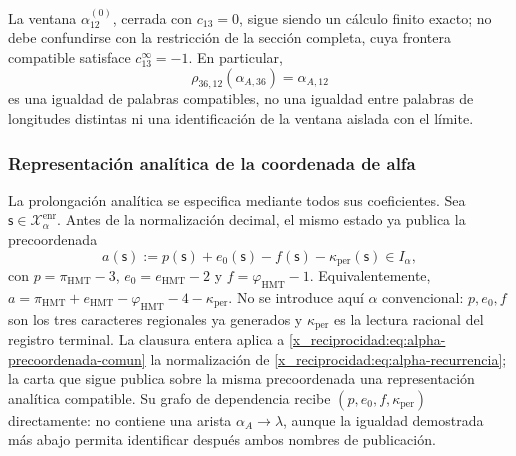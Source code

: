 La ventana \(\alpha_{12}^{(0)}\), cerrada con \(c_{13}=0\), sigue siendo un
cálculo finito exacto; no debe confundirse con la restricción de la sección
completa, cuya frontera compatible satisface \(c_{13}^{\infty}=-1\). En
particular,
\begin{equation}
 \rho_{36,12}(\alpha_{A,36})=\alpha_{A,12}
 \label{x_reciprocidad:eq:alpha-rho-36-12-proyectiva}
\end{equation}
es una igualdad de palabras compatibles, no una igualdad entre palabras de
longitudes distintas ni una identificación de la ventana aislada con el
límite.



\subsubsection{Representación analítica de la coordenada de alfa}
\label{x_reciprocidad:subsec:alpha-lector-completo-rev08}

La prolongación analítica se especifica mediante todos sus coeficientes.
Sea \(\mathsf s\in\mathcal X_\alpha^{\mathrm{enr}}\). Antes
de la normalización decimal, el mismo estado ya publica la precoordenada
\begin{equation}
 a(\mathsf s):=p(\mathsf s)+e_0(\mathsf s)-f(\mathsf s)
                 -\kappa_{\mathrm{per}}(\mathsf s)\in I_\alpha,
 \label{x_reciprocidad:eq:alpha-precoordenada-comun}
\end{equation}
con \(p=\pi_{\mathrm{HMT}}-3\),
\(e_0=e_{\mathrm{HMT}}-2\) y
\(f=\varphi_{\mathrm{HMT}}-1\). Equivalentemente,
\(a=\pi_{\mathrm{HMT}}+e_{\mathrm{HMT}}-
\varphi_{\mathrm{HMT}}-4-\kappa_{\mathrm{per}}\). No se introduce aquí
\(\alpha\) convencional: \(p,e_0,f\) son los tres caracteres regionales ya
generados y \(\kappa_{\mathrm{per}}\) es la lectura racional del registro
terminal. La clausura entera aplica a
\eqref{x_reciprocidad:eq:alpha-precoordenada-comun} la normalización de
\eqref{x_reciprocidad:eq:alpha-recurrencia}; la carta que sigue publica sobre la misma
precoordenada una representación analítica compatible. Su grafo de
dependencia recibe \((p,e_0,f,\kappa_{\mathrm{per}})\) directamente: no
contiene una arista \(\alpha_A\to\lambda\), aunque la igualdad demostrada más
abajo permita identificar después ambos nombres de publicación.

